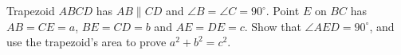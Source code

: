 Trapezoid $ABCD$ has $AB\parallel CD$ and $\angle B=\angle C=90^\circ$. Point $E$ on $BC$ has $AB=CE=a$, $BE=CD=b$ and $AE=DE=c$. Show that $\angle AED=90^\circ$, and use the trapezoid's area to prove $a^2+b^2=c^2$.

